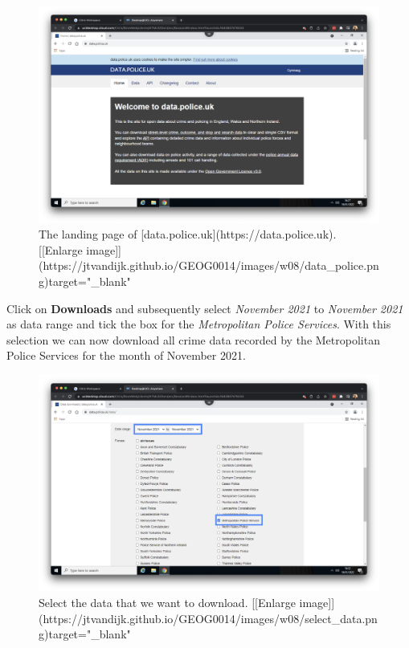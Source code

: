 \documentclass[
]{book}
\begin{document}
\begin{figure}

{\centering \includegraphics[width=850pt]{images/w08/data_police} 

}

\caption{The landing page of [data.police.uk](https://data.police.uk). [[Enlarge image]](https://jtvandijk.github.io/GEOG0014/images/w08/data_police.png){target="_blank"}}\label{fig:data-police}
\end{figure}

Click on \textbf{Downloads} and subsequently select \emph{November 2021} to \emph{November 2021} as data range and tick the box for the \emph{Metropolitan Police Services}. With this selection we can now download all crime data recorded by the Metropolitan Police Services for the month of November 2021.

\begin{figure}

{\centering \includegraphics[width=850pt]{images/w08/select_data} 

}

\caption{Select the data that we want to download. [[Enlarge image]](https://jtvandijk.github.io/GEOG0014/images/w08/select_data.png){target="_blank"}}\label{fig:data-police-select}
\end{figure}
\end{document}
